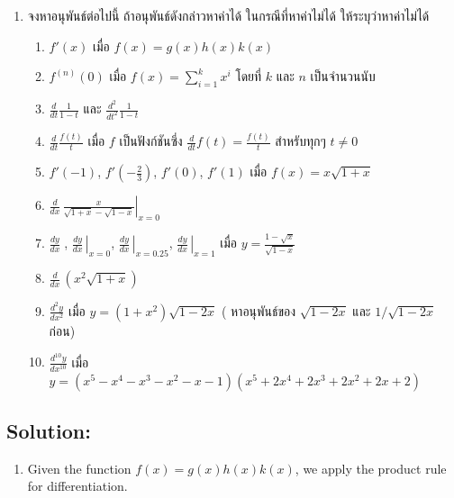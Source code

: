 \documentclass[
]{book}
\providecommand{\tightlist}{%
  \setlength{\itemsep}{0pt}\setlength{\parskip}{0pt}}
\begin{document}
\begin{enumerate}
\def\labelenumi{\arabic{enumi}.}
\item
  จงหาอนุพันธ์ต่อไปนี้ ถ้าอนุพันธ์ดังกล่าวหาค่าได้ ในกรณีที่หาค่าไม่ได้ ให้ระบุว่าหาค่าไม่ได้

  \begin{enumerate}
  \def\labelenumii{\arabic{enumii}.}
  \item
    \(\displaystyle f'(x)\) เมื่อ \(f(x)=g(x)h(x)k(x)\)
  \item
    \(\displaystyle f^{(n)}(0)\) เมื่อ
    \(\displaystyle f(x)=\sum_{i=1}^k x^i\) โดยที่ \(k\) และ \(n\)
    เป็นจำนวนนับ
  \item
    \(\displaystyle\frac{d}{dt}\frac1{1-t}\) และ
    \(\displaystyle\frac{d^2}{dt^2}\frac1{1-t}\)
  \item
    \(\displaystyle\frac{d}{dt}\frac{f(t)}t\) เมื่อ \(f\) เป็นฟังก์ชันซึ่ง
    \(\displaystyle\frac{d}{dt}f(t)=\frac{f(t)}t\) สำหรับทุกๆ \(t\neq0\)
  \item
    \(f'(-1)\), \(f'(-\frac23)\), \(f'(0)\), \(f'(1)\) เมื่อ
    \(f(x)=x\sqrt{1+x}\)
  \item
    \(\displaystyle\left.\frac d{dx}\,\frac x{\sqrt{1+x}-\sqrt{1-x}}\right|_{x=0}\)
  \item
    \(\displaystyle\frac {dy}{dx}\;\),
    \(\displaystyle\left.\frac {dy}{dx}\,\right|_{x=0}\),
    \(\displaystyle\left.\frac {dy}{dx}\,\right|_{x=0.25}\),
    \(\displaystyle\left.\frac {dy}{dx}\,\right|_{x=1}\) เมื่อ
    \(\displaystyle y=\frac{1-\sqrt x}{\sqrt{1-x}}\)
  \item
    \(\displaystyle\frac d{dx}\,\left(x^2\sqrt{1+x}\right)\)
  \item
    \(\displaystyle\frac {d^2y}{dx^2}\) เมื่อ \(y=(1+x^2)\sqrt{1-2x}\) (
    หาอนุพันธ์ของ \(\sqrt{1-2x}\) และ \(1/\sqrt{1-2x}\) ก่อน)
  \item
    \(\displaystyle\frac {d^{10}y}{dx^{10}}\) เมื่อ
    \(y=\left(x^5-x^4-x^3-x^2-x-1\right)\left(x^5+2x^4+2x^3+2x^2+2x+2\right)\)
  \end{enumerate}
\end{enumerate}

\subsection{Solution:}\label{solution}

\begin{enumerate}
\def\labelenumi{\arabic{enumi}.}
\tightlist
\item
  Given the function \(f(x) = g(x)h(x)k(x)\), we apply the product rule
  for differentiation.
\end{enumerate}
\end{document}
